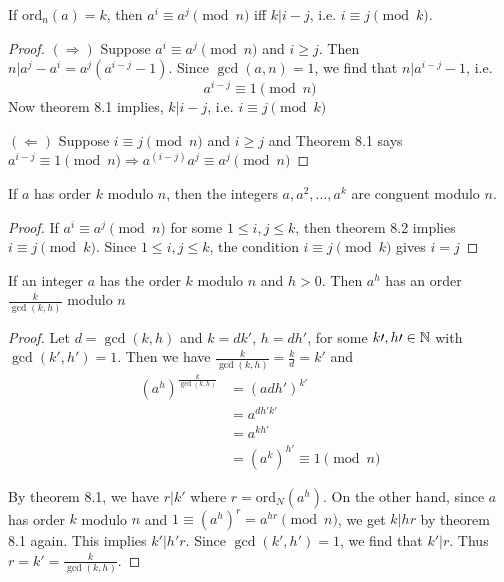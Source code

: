 \begin{theorem}
    If $\text{ord}_{n}(a) = k$, then $a^i \equiv a^j \pmod n$ iff $k | i - j$, i.e. $i \equiv j \pmod k$.
\end{theorem}
\begin{proof}
    $(\Rightarrow)$ Suppose $a^i \equiv a^j \pmod n$ and $i \geq j$.
    Then $n | a^j - a^i = a^j(a^{i-j} - 1)$.
    Since $\gcd(a, n) = 1$, we find that $n | a^{i-j} - 1$, i.e.
    \[
        a^{i-j} \equiv 1 \pmod n
    \]
    Now theorem 8.1 implies, $k | i-j$, i.e. $i \equiv j \pmod k$

    $(\Leftarrow)$ Suppose $i \equiv j \pmod n$ and $i \geq j$ and 
    Theorem 8.1 says $a^{i-j} \equiv 1 \pmod n \Rightarrow a^{(i-j)} a^j \equiv a^j \pmod n$
\end{proof}
\begin{corollary}
    If $a$ has order $k$ modulo $n$, then the integers $a, a^2, \dots, a^k$ are conguent modulo $n$.
\end{corollary}
\begin{proof}
    If $a^i \equiv a^j \pmod n$ for some $1 \leq i, j \leq k$, then theorem 8.2 implies $i \equiv j \pmod k$.
    Since $1 \leq i, j \leq k$, the condition $i \equiv j \pmod k$ gives $i = j$
\end{proof}

\begin{theorem}
    If an integer $a$ has the order $k$ modulo $n$ and $h > 0$. 
    Then $a^h$ has an order $\frac{k}{\gcd(k, h)}$ modulo $n$
\end{theorem}
\begin{proof}
    Let $d = \gcd(k, h)$ and $k = dk\prime$, $h = dh\prime$, 
    for some $k\prime, h\prime \in \mathbb{N}$ with $\gcd(k\prime, h\prime) = 1$.
    Then we have $\frac{k}{\gcd(k, h)} = \frac{k}{d} = k\prime$ and
    \[
        \begin{aligned}
            {(a^h)}^{\frac{k}{\gcd(k, h)}} &= {(adh\prime)}^{k\prime} \\
            &= a^{dh\prime k\prime} \\
            &= a^{kh\prime} \\
            &= {(a^k)}^{h\prime} \equiv 1 \pmod n
        \end{aligned}
    \]

    By theorem 8.1, we have $r | k\prime$ where $r = \text{ord}_N(a^h)$.
    On the other hand, since $a$ has order $k$ modulo $n$ and $1 \equiv {(a^h)}^r = a^{hr} \pmod n$,
    we get $k | hr$ by theorem 8.1 again. This implies $k\prime | h\prime r$. Since
    $\gcd(k\prime, h\prime) = 1$, we find that $k\prime | r$. Thus $r = k\prime = \frac{k}{\gcd(k, h)}$.
\end{proof}


